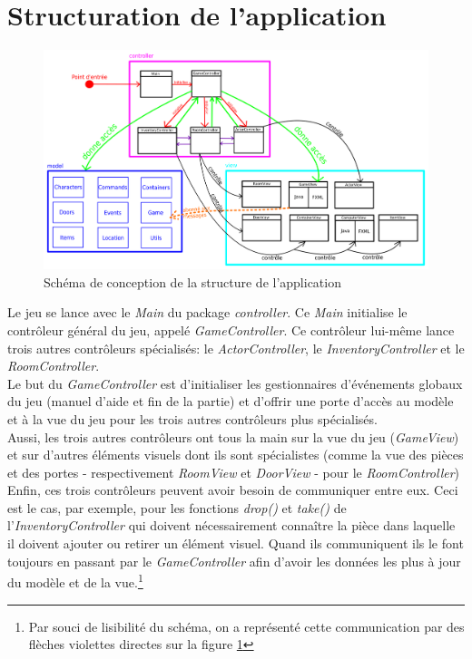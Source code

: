 \documentclass[./standalone.tex]{subfiles}
\begin{document}
\section{Structuration de l'application}

\begin{center}
	\begin{figure}[h!]
	\includegraphics[scale=0.3]{images/structuration.png}
	\caption{Schéma de conception de la structure de l'application}
	\label{structuration}
	\end{figure}
\end{center}

Le jeu se lance avec le \textit{Main} du package \textit{controller}. Ce \textit{Main} initialise le contrôleur général du jeu, appelé \textit{GameController}. Ce contrôleur lui-même lance trois autres contrôleurs spécialisés: le \textit{ActorController}, le \textit{InventoryController} et le \textit{RoomController}.\\

Le but du \textit{GameController} est d'initialiser les gestionnaires d'événements globaux du jeu (manuel d'aide et fin de la partie) et d'offrir une porte d'accès au modèle et à la vue du jeu pour les trois autres contrôleurs plus spécialisés.\\

Aussi, les trois autres contrôleurs ont tous la main sur la vue du jeu (\textit{GameView}) et sur d'autres éléments visuels dont ils sont spécialistes (comme la vue des pièces et des portes - respectivement \textit{RoomView} et \textit{DoorView} - pour le \textit{RoomController})\\

Enfin, ces trois contrôleurs peuvent avoir besoin de communiquer entre eux. Ceci est le cas, par exemple, pour les fonctions \textit{drop()} et \textit{take()} de l'\textit{InventoryController} qui doivent nécessairement connaître la pièce dans laquelle il doivent ajouter ou retirer un élément visuel. Quand ils communiquent ils le font toujours en passant par le \textit{GameController} afin d'avoir les données les plus à jour du modèle et de la vue.\footnote{Par souci de lisibilité du schéma, on a représenté cette communication par des flèches violettes directes sur la figure \ref{structuration}}\\
\end{document}
